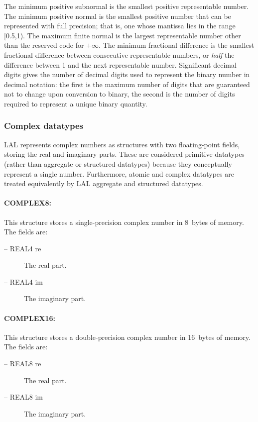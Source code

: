 \documentclass[10pt]{ligodcc}
\renewcommand{\texttt}[1]{{\ttfamily\color{blue}#1}}
\begin{document}
The minimum positive subnormal is the smallest positive representable
number.  The minimum positive normal is the smallest positive number
that can be represented with full precision; that is, one whose
mantissa lies in the range [0.5,1).  The maximum finite normal is the
largest representable number other than the reserved code for
$+\infty$.  The minimum fractional difference is the smallest
fractional difference between consecutive representable numbers, or
\emph{half} the difference between 1 and the next representable
number.  Significant decimal digits gives the number of decimal digits
used to represent the binary number in decimal notation: the first is
the maximum number of digits that are guaranteed not to change upon
conversion to binary, the second is the number of digits required to
represent a unique binary quantity.

\subsubsection*{Complex datatypes}

LAL represents complex numbers as structures with two floating-point
fields, storing the real and imaginary parts.  These are considered
primitive datatypes (rather than aggregate or structured datatypes)
because they conceptually represent a single number.  Furthermore,
atomic and complex datatypes are treated equivalently by LAL aggregate
and structured datatypes.

\paragraph{\texttt{COMPLEX8}:}
This structure stores a single-precision complex number in 8~bytes of
memory.  The fields are:
\begin{description}
\item[-- \texttt{REAL4 re}] The real part.
\item[-- \texttt{REAL4 im}] The imaginary part.
\end{description}

\paragraph{\texttt{COMPLEX16}:}
This structure stores a double-precision complex number in 16~bytes of
memory.  The fields are:
\begin{description}
\item[-- \texttt{REAL8 re}] The real part.
\item[-- \texttt{REAL8 im}] The imaginary part.
\end{description}
\end{document}
